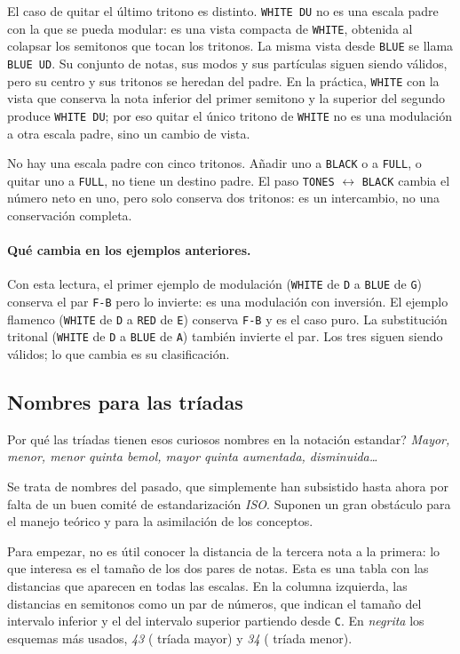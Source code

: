 \documentclass[]{report}
\begin{document}
El caso de quitar el último tritono es distinto. \texttt{WHITE DU} no es una
escala padre con la que se pueda modular: es una vista compacta de
\texttt{WHITE}, obtenida al colapsar los semitonos que tocan los tritonos. La
misma vista desde \texttt{BLUE} se llama \texttt{BLUE UD}. Su conjunto de notas,
sus modos y sus partículas siguen siendo válidos, pero su centro y sus tritonos
se heredan del padre. En la práctica, \texttt{WHITE} con la vista que conserva
la nota inferior del primer semitono y la superior del segundo produce
\texttt{WHITE DU}; por eso quitar el único tritono de \texttt{WHITE} no es una
modulación a otra escala padre, sino un cambio de vista.

No hay una escala padre con cinco tritonos. Añadir uno a \texttt{BLACK} o a
\texttt{FULL}, o quitar uno a \texttt{FULL}, no tiene un destino padre. El paso
\texttt{TONES} $\leftrightarrow$ \texttt{BLACK} cambia el número neto en uno,
pero solo conserva dos tritonos: es un intercambio, no una conservación
completa.

\paragraph{Qué cambia en los ejemplos anteriores.}
Con esta lectura, el primer ejemplo de modulación (\texttt{WHITE} de \texttt{D}
a \texttt{BLUE} de \texttt{G}) conserva el par \texttt{F-B} pero lo invierte:
es una modulación con inversión. El ejemplo flamenco (\texttt{WHITE} de
\texttt{D} a \texttt{RED} de \texttt{E}) conserva \texttt{F-B} y es el caso
puro. La substitución tritonal (\texttt{WHITE} de \texttt{D} a \texttt{BLUE} de
\texttt{A}) también invierte el par. Los tres siguen siendo válidos; lo que
cambia es su clasificación.

\subsection{Nombres para las tríadas}

Por qué las tríadas tienen esos curiosos nombres en la notación estandar? \emph{Mayor, menor, menor quinta bemol, mayor quinta   aumentada, disminuida\ldots{}}

Se trata de nombres del pasado, que simplemente han subsistido hasta ahora por falta de un buen comité de estandarización \emph{ISO}. Suponen un gran obstáculo para el manejo teórico y para la asimilación de los conceptos.

Para empezar, no es útil conocer la distancia de la tercera nota a la primera: lo que interesa es el tamaño de los dos pares de notas. Esta es una tabla con las distancias que aparecen en todas las escalas. En la columna izquierda, las distancias en semitonos como un par de números, que indican el tamaño del intervalo inferior y el del intervalo superior partiendo desde \texttt{C}. En \emph{negrita} los esquemas más usados, \emph{43} ( tríada mayor) y \emph{34} ( tríada menor).
\end{document}
